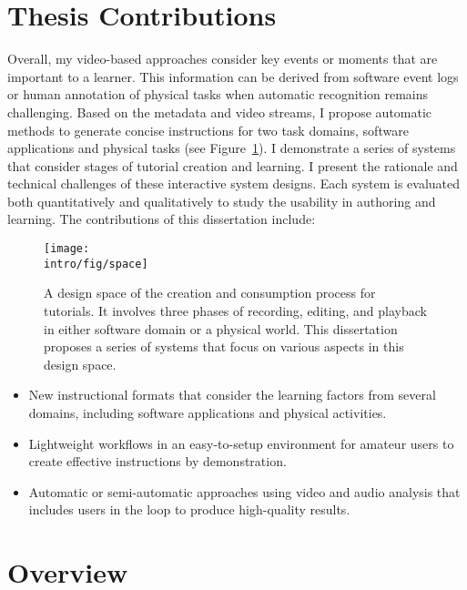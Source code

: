 
\section{Thesis Contributions}

Overall, my video-based approaches consider key events or moments that are important to a learner. This information can be derived from software event logs or human annotation of physical tasks when automatic recognition remains challenging. Based on the metadata and video streams, I propose automatic methods to generate concise instructions for two task domains, software applications and physical tasks (see Figure~\ref{fig:space}). I demonstrate a series of systems that consider stages of tutorial creation and learning.
%
I present the rationale and technical challenges of these interactive system designs. Each system is evaluated both quantitatively and qualitatively to study the usability in authoring and learning. The contributions of this dissertation include:

\begin{figure}[t]
  \centering
  \texttt{[image: \\intro/fig/space]}
  \caption{A design space of the creation and consumption process for tutorials. It involves three phases of recording, editing, and playback in either software domain or a physical world. This dissertation proposes a series of systems that focus on various aspects in this design space. }
  \label{fig:space}
\end{figure}

\begin{itemize}
  \setlength{\itemsep}{0pt}
\item New instructional formats that consider the learning factors from several domains, including software applications and physical activities.
\item Lightweight workflows in an easy-to-setup environment for amateur users to create effective instructions by demonstration.
\item Automatic or semi-automatic approaches using video and audio analysis that includes users in the loop to produce high-quality results.
\end{itemize}


\section{Overview}

